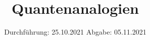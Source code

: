 
\setlength\parindent{0pt}
\subject{V23}
\title{Quantenanalogien}
\date{%
  Durchführung: 25.10.2021
  \hspace{3em}
  Abgabe: 05.11.2021 \\
}



\thispagestyle{empty}
\tableofcontents
\newpage







\newpage
\nocite{*}
\printbibliography


